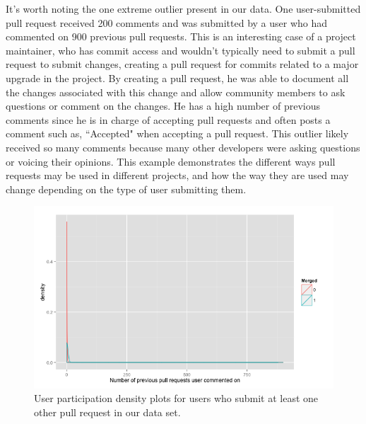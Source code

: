 \documentclass{sigchi}
\begin{document}
It's worth noting the one extreme outlier present in our data. One user-submitted pull request received 200 comments and was submitted by a user who had
commented on 900 previous pull requests. This is an interesting case of a
project maintainer, who has commit access and wouldn't typically need to submit
a pull request to submit changes, creating a pull request for commits related to
a major upgrade in the project. By creating a pull request, he was able to
document all the changes associated with this change and allow community members
to ask questions or comment on the changes. He has a high number of previous
comments since he is in charge of accepting pull requests and often posts a comment such as, ``Accepted" when accepting a pull request. This outlier likely received so many comments because many other developers were asking questions or voicing their opinions.
This example demonstrates the different ways pull requests may
be used in different projects, and how the way they are used may change
depending on the type of user submitting them.

\begin{figure}[p] \centering
\includegraphics[scale=0.6]{figures/number_comments_density_repeaters_ggplot.png}
\caption{User participation density plots for users who submit at least one
other pull request in our data set.} \label{fig:repeaters} \end{figure}
\end{document}
